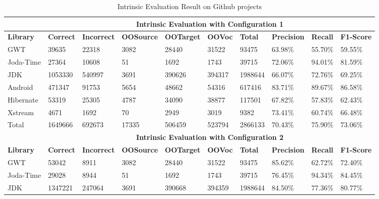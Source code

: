   \begin{table}[t]
  \small
  \centering
  \caption{Intrinsic Evaluation Result on Github projects}
\begin{tabular}{|l|l|l|l|l|l|l|l|l|l|}
\hline
          &  \multicolumn{9}{c|}{\textbf{Intrinsic Evaluation with Configuration 1}}           \\
\hline
\textbf{Library}   & \textbf{Correct} & \textbf{Incorrect} & \textbf{OOSource} & \textbf{OOTarget} & \textbf{OOVoc}  & \textbf{Total}   & \textbf{Precision} & \textbf{Recall}  & \textbf{F1-Score} \\ \hline
GWT       & 39635   & 22318     & 3082     & 28440    & 31522  & 93475   & 63.98\%   & 55.70\% & 59.55\%  \\ \hline
Joda-Time & 27364   & 10608     & 51       & 1692     & 1743   & 39715   & 72.06\%   & 94.01\% & 81.59\%  \\ \hline
JDK       & 1053330 & 540997    & 3691     & 390626   & 394317 & 1988644 & 66.07\%   & 72.76\% & 69.25\%  \\ \hline
Android   & 471347  & 91753     & 5654     & 48662    & 54316  & 617416  & 83.71\%   & 89.67\% & 86.58\%  \\ \hline
Hibernate & 53319   & 25305     & 4787     & 34090    & 38877  & 117501  & 67.82\%   & 57.83\% & 62.43\%  \\ \hline
Xstream   & 4671    & 1692      & 70       & 2949     & 3019   & 9382    & 73.41\%   & 60.74\% & 66.48\%  \\ \hline
Total     & 1649666 & 692673    & 17335    & 506459   & 523794 & 2866133 & 70.43\%   & 75.90\% & 73.06\%  \\ \hline
          & \multicolumn{9}{c|}{\textbf{Intrinsic Evaluation with Configuration 2}} \\
\hline
\textbf{Library}   & \textbf{Correct} & \textbf{Incorrect} & \textbf{OOSource} & \textbf{OOTarget} & \textbf{OOVoc}  & \textbf{Total}   & \textbf{Precision} & \textbf{Recall}  & \textbf{F1-Score} \\ \hline
GWT       & 53042                                     & 8911      & 3082     & 28440    & 31522  & 93475   & 85.62\%   & 62.72\% & 72.40\%  \\ \hline
Joda-Time & 29028                                     & 8944      & 51       & 1692     & 1743   & 39715   & 76.45\%   & 94.34\% & 84.45\%  \\
\hline
JDK       & 1347221                                   & 247064    & 3691     & 390668   & 394359 & 1988644 & 84.50\%   & 77.36\% & 80.77\%  \\

\end{tabular}
\end{table}
